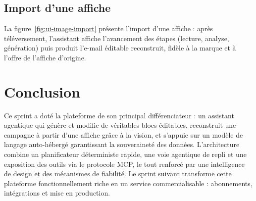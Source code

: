 \subsection{Import d'une affiche}
La figure~\ref{fig:ui-image-import} présente l'import d'une affiche : après
téléversement, l'assistant affiche l'avancement des étapes (lecture, analyse,
génération) puis produit l'e-mail éditable reconstruit, fidèle à la marque
et à l'offre de l'affiche d'origine.


\section*{Conclusion}
Ce sprint a doté la plateforme de son principal différenciateur : un
assistant agentique qui génère et modifie de véritables blocs éditables,
reconstruit une campagne à partir d'une affiche grâce à la vision, et
s'appuie sur un modèle de langage auto-hébergé garantissant la souveraineté
des données. L'architecture combine un planificateur déterministe rapide,
une voie agentique de repli et une exposition des outils via le protocole
MCP, le tout renforcé par une intelligence de design et des mécanismes de
fiabilité. Le sprint suivant transforme cette plateforme fonctionnellement
riche en un service commercialisable : abonnements, intégrations et mise en
production.
